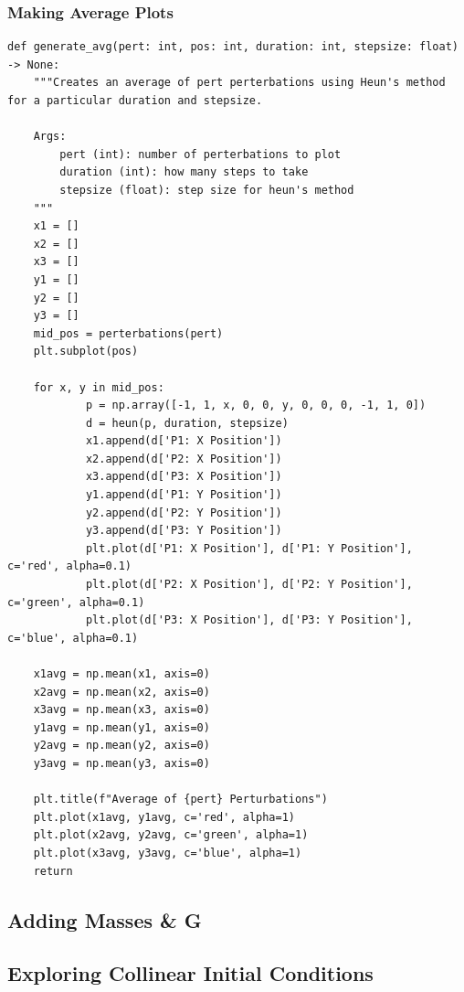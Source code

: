 \documentclass{article}
\begin{document}
\subsubsection{Making Average Plots}
\begin{verbatim}
def generate_avg(pert: int, pos: int, duration: int, stepsize: float) -> None:
    """Creates an average of pert perterbations using Heun's method for a particular duration and stepsize.

    Args:
        pert (int): number of perterbations to plot
        duration (int): how many steps to take
        stepsize (float): step size for heun's method
    """
    x1 = []
    x2 = []
    x3 = []
    y1 = []
    y2 = []
    y3 = []
    mid_pos = perterbations(pert)
    plt.subplot(pos)

    for x, y in mid_pos:
            p = np.array([-1, 1, x, 0, 0, y, 0, 0, 0, -1, 1, 0])
            d = heun(p, duration, stepsize)
            x1.append(d['P1: X Position'])
            x2.append(d['P2: X Position'])
            x3.append(d['P3: X Position'])
            y1.append(d['P1: Y Position'])
            y2.append(d['P2: Y Position'])
            y3.append(d['P3: Y Position'])
            plt.plot(d['P1: X Position'], d['P1: Y Position'], c='red', alpha=0.1)
            plt.plot(d['P2: X Position'], d['P2: Y Position'], c='green', alpha=0.1)
            plt.plot(d['P3: X Position'], d['P3: Y Position'], c='blue', alpha=0.1)

    x1avg = np.mean(x1, axis=0)
    x2avg = np.mean(x2, axis=0)
    x3avg = np.mean(x3, axis=0)
    y1avg = np.mean(y1, axis=0)
    y2avg = np.mean(y2, axis=0)
    y3avg = np.mean(y3, axis=0)

    plt.title(f"Average of {pert} Perturbations")
    plt.plot(x1avg, y1avg, c='red', alpha=1)
    plt.plot(x2avg, y2avg, c='green', alpha=1)
    plt.plot(x3avg, y3avg, c='blue', alpha=1)
    return
\end{verbatim}

\subsection{Adding Masses \& G}

\subsection{Exploring Collinear Initial Conditions}
\end{document}
